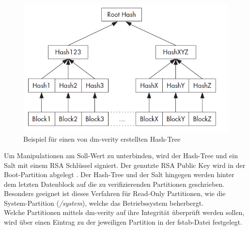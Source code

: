 	\begin{figure}[h]
		\centering
		\includegraphics[width=0.7\linewidth]{android_pages/graphics/dm_verity_hash_tree.png}
		\caption{Beispiel für einen von dm-verity erstellten Hash-Tree \protect\cite[S. 255]{Drake2014}}
		\label{fig:dm-verity-table}
	\end{figure}
	
\begin{flushleft}
	Um Manipulationen am Soll-Wert zu unterbinden, wird der Hash-Tree und ein Salt mit einem RSA Schlüssel signiert. Der genutzte RSA Public Key wird in der Boot-Partition abgelegt \cite[S. 255]{Drake2014}. Der Hash-Tree und der Salt hingegen werden hinter dem letzten Datenblock auf die zu verifizierenden Partitionen geschrieben. Besonders geeignet ist dieses Verfahren für Read-Only Partitionen, wie die System-Partition (\textit{/system}), welche das Betriebssystem beherbergt.\\
	Welche Partitionen mittels dm-verity auf ihre Integrität überprüft werden sollen, wird über einen Eintrag zu der jeweiligen Partition in der fstab-Datei festgelegt.
\end{flushleft}

